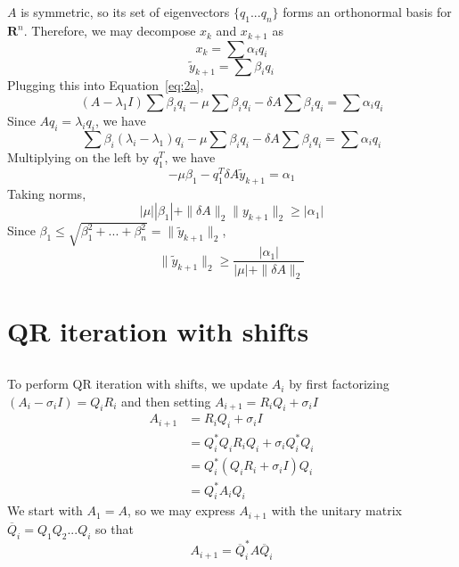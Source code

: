 \documentclass[11pt]{article} %
\begin{document}
\subsection{} %
$A$ is symmetric, so its set of eigenvectors $\{q_1 ... q_n\}$ forms an orthonormal basis for $\mathbf{R}^n$. Therefore, we may decompose $x_k$ and $x_{k+1}$ as
\begin{equation}
x_k = \sum \alpha_i q_i
\end{equation}
\begin{equation}
\tilde{y}_{k+1} = \sum \beta_i q_i
\end{equation}
Plugging this into Equation~\ref{eq:2a},
\begin{equation}
(A-\lambda_1 I ) \sum \beta_i q_i -\mu \sum \beta_i q_i - \delta A \sum \beta_i q_i = \sum \alpha_i q_i
\end{equation}
Since $A q_i = \lambda_i q_i$, we have 
\begin{equation}
 \sum \beta_i (\lambda_i - \lambda_1) q_i -\mu \sum \beta_i q_i - \delta A \sum \beta_i q_i = \sum \alpha_i q_i
\end{equation}
Multiplying on the left by $q_1^T$, we have
\begin{equation}
-\mu \beta_1- q_1^T \delta A \tilde{y}_{k+1} = \alpha_1
\end{equation}
Taking norms, 
\begin{equation}
 | \mu | | \beta_1 | + \| \delta A \|_2 \| y_{k+1} \|_2 \ge | \alpha_1 | 
\end{equation}
Since $\beta_1 \le \sqrt{\beta_1^2 + ... +\beta_n^2} = \| \tilde{y}_{k+1}\|_2$,
\begin{equation}
\boxed{ \| \tilde{y}_{k+1} \|_2 \ge \frac{ | \alpha_1 |}{ | \mu | + \| \delta A \|_2}}
\end{equation}
\section{QR iteration with shifts}
\subsection{} %
To perform QR iteration with shifts, we update $A_i$ by first factorizing $(A_i - \sigma_i I)=Q_i R_i $ and then setting $A_{i+1}=R_i Q_i +\sigma_i I$
\begin{equation}
\begin{split}
A_{i+1} &= R_i Q_i +\sigma_i I\\
&= Q_i^* Q_i R_i Q_i + \sigma_i Q_i^* Q_i\\
&=Q_i^* (Q_i R_i + \sigma_i I) Q_i\\
& = Q_i^* A_i Q_i
\end{split}
\end{equation}
We start with $A_1 = A$, so we may express $A_{i+1}$ with the unitary matrix $\overline{Q}_i = Q_1 Q_2 ... Q_i$ so that
\begin{equation}
\boxed{A_{i+1} = \overline{Q}_i^* A \overline{Q}_i}
\end{equation}
\end{document}
